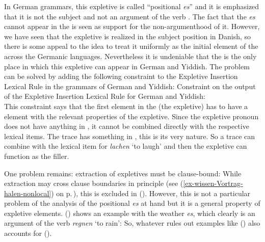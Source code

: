 \eal
{}
\zl
In German grammars, this expletive is called ``positional \emph{es}'' and it is emphasized that it is
not the subject and not an argument of the verb \parencites[, 177, 371]{Eisenberg2004a}[§1263]{Duden2005}. The fact that the \emph{es} cannot appear in the
\mf is seen as support for the non-argumenthood of it. However, we have seen that the expletive is
realized in the subject position in Danish, so there is some appeal to the idea to treat it
uniformly as the initial element of the \argstl across the Germanic languages. Nevertheless it is
undeniable that the \vf is the only place in which this expletive can appear in German and Yiddish.  
The problem can be solved by adding the following constraint to the Expletive Insertion Lexical Rule
in the grammars of German and Yiddish:
\ea
Constraint on the output of the Expletive Insertion Lexical Rule for German and Yiddish:\\
\z
This constraint says that the first element in the \argstl (the expletive) has to have a \slasch
element with the relevant properties of the expletive. Since the expletive pronoun does not have
anything in \slasch, it cannot be combined directly with the respective lexical items. The trace has
something in \slasch, this is its very nature. So a trace can combine with the lexical item for
\emph{lachen} `to laugh' and then the expletive can function as the filler.

One problem remains: extraction of expletives must be clause-bound:
\z
While extraction may cross clause boundaries in principle (see
(\ref{ex-wissen-Vortrag-halen-nonlocal}) on p.\,\pageref{ex-wissen-Vortrag-halen-nonlocal}), this is excluded in
(). However, this is not a particular problem of the analysis of the positional \emph{es} at
hand but it is a general property of expletive elements. () shows an example with the weather
\emph{es}, which clearly is an argument of the verb \emph{regnen} `to rain':
\z
So, whatever rules out examples like () also accounts for ().


